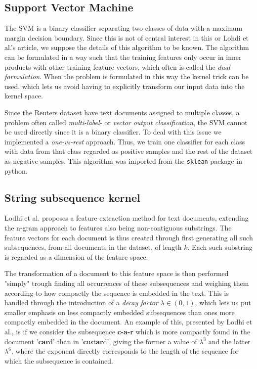 
\subsection{Support Vector Machine}
The SVM is a binary classifier separating two classes of data with a maximum margin decision boundary. Since this is not of central interest in this or Lohdi et al.'s article, we suppose the details of this algorithm to be known. The algorithm can be formulated in a way such that the training features only occur in inner products with other training feature vectors, which often is called the \textit{dual formulation}. When the problem is formulated in this way the kernel trick can be used, which lets us avoid having to explicitly transform our input data into the kernel space. 

Since the Reuters dataset have text documents assigned to multiple classes, a problem often called\textit{ multi-label-} or \textit{vector output classification}, the SVM cannot be used directly since it is a binary classifier. To deal with this issue we implemented a \textit{one-vs-rest} approach. Thus, we train one classifier for each class with data from that class regarded as positive samples and the rest of the dataset as negative samples. This algorithm was imported from the \texttt{sklean} package in python. 

\subsection{String subsequence kernel}
Lodhi et al. proposes a feature extraction method for text documents, extending the n-gram approach to features also being non-contiguous substrings. The feature vectors for each document is thus created through first generating all such subsequences, from all documents in the dataset, of length $ k $. Each such substring is regarded as a dimension of the feature space. 

The transformation of a document to this feature space is then performed "simply" trough finding all occurrences of these subsequences and weighing them according to how compactly the sequence is embedded in the text. This is handled through the introduction of a \textit{decay factor} $ \lambda \in (0,1) $, which lets us put smaller emphasis on less compactly embedded subsequences than ones more compactly embedded in the document. An example of this, presented by Lodhi et al., is if we consider the subsequence \textbf{c-a-r} which is more compactly found in the document '\textbf{car}d' than in   '\textbf{c}ust\textbf{ar}d', giving the former a value of $ \lambda^3 $ and the latter $ \lambda^6 $, where the exponent directly corresponds to the length of the sequence for which the subsequence is contained.


